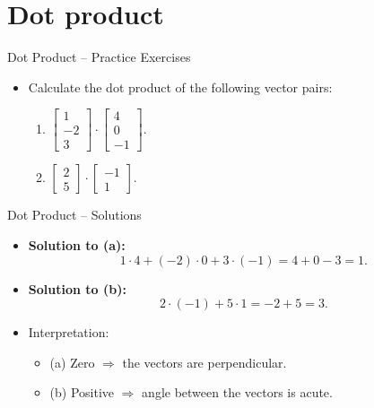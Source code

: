 \documentclass{beamer}
\begin{document}
\section{Dot product}
\begin{frame}{Dot Product – Practice Exercises}
  \begin{itemize}
    \item Calculate the dot product of the following vector pairs:
    \begin{enumerate}
      \item $\begin{bmatrix} 1 \\ -2 \\ 3 \end{bmatrix} \cdot \begin{bmatrix} 4 \\ 0 \\ -1 \end{bmatrix}.$
      \item $\begin{bmatrix} 2 \\ 5 \end{bmatrix} \cdot \begin{bmatrix} -1 \\ 1 \end{bmatrix}.$
    \end{enumerate}
  \end{itemize}
\end{frame}

\begin{frame}{Dot Product – Solutions}
  \begin{itemize}
    \item \textbf{Solution to (a):}
    \[
    1 \cdot 4 + (-2) \cdot 0 + 3 \cdot (-1) = 4 + 0 - 3 = \boxed{1}.
    \]
    \item \textbf{Solution to (b):}
    \[
    2 \cdot (-1) + 5 \cdot 1 = -2 + 5 = \boxed{3}.
    \]
    \item Interpretation:
    \begin{itemize}
      \item (a) Zero \(\Rightarrow\) the vectors are perpendicular.
      \item (b) Positive \(\Rightarrow\) angle between the vectors is acute.
    \end{itemize}
  \end{itemize}
\end{frame}
\end{document}
